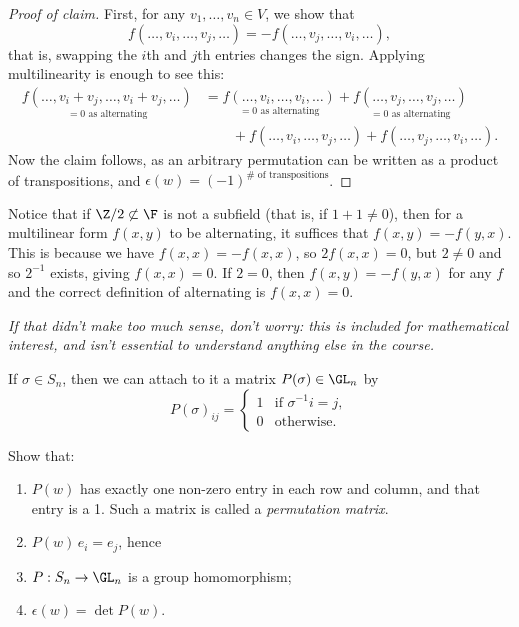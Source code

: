 \begin{proof}
	[Proof of claim] First, for any $v_1,\ldots,v_n\in V$, we show that %
	\begin{equation*}
		f(\ldots, v_i, \ldots, v_j, \ldots)
		= -f(\ldots,v_j,\ldots,v_i,\ldots),
	\end{equation*}
	that is, swapping the $i$th and $j$th entries changes the sign. Applying multilinearity is enough to see this: %
	\begin{align*}
		   \underset{=0 \text{ as alternating}}{f(\ldots,v_i+v_j,\ldots,v_i+v_j,\ldots)} %
		&= \underset{=0 \text{ as alternating}}{f(\ldots,v_i,\ldots,v_i,\ldots)}
		 + \underset{=0 \text{ as alternating}}{f(\ldots,v_j,\ldots,v_j,\ldots)} \\
		&\qquad
		 + f(\ldots,v_i,\ldots,v_j,\ldots)
		 + f(\ldots,v_j,\ldots,v_i,\ldots).
	\end{align*}
	Now the claim follows, as an arbitrary permutation can be written as a product of transpositions, and $\epsilon(w)=\left( -1 \right)^{\#\text{ of transpositions}}$. %
\end{proof}

\begin{remark}
	Notice that if $\Z/2\not\subset\F$ is not a subfield (that is, if $1+1\neq 0$), then for a multilinear form $f(x,y)$ to be alternating, it suffices that $f(x,y)=-f(y,x)$. This is because we have $f(x,x)=-f(x,x)$, so $2f(x,x)=0$, but $2\neq 0$ and so $2^{-1}$ exists, giving $f(x,x)=0$. If $2=0$, then $f(x,y)=-f(y,x)$ for any $f$ and the correct definition of alternating is $f(x,x)=0$. %

	\emph{If that didn't make too much sense, don't worry: this is included for mathematical interest, and isn't essential to understand anything else in the course.} %
\end{remark}

\begin{remark}
	If $\sigma\in S_n$, then we can attach to it a matrix $P(\sigma)\in\GL_n$ by %
	\begin{equation*}
		P(\sigma)_{ij} =
		\begin{cases}
			1 & \text{if } \sigma^{-1} i = j, \\ %
			0 & \text{otherwise}.
		\end{cases}
	\end{equation*}
\end{remark}

\begin{exercises}
Show that:
\begin{enumerate}
	\shortskip
	\item $P(w)$ has exactly one non-zero entry in each row and column, and that entry is a 1. Such a matrix is called a \emph{permutation matrix}. %
	\item $P(w)\,e_i = e_j$, hence
	\item $P:S_n \to \GL_n$ is a group homomorphism;
	\item $\epsilon(w)=\det P(w)$.
\end{enumerate}
\end{exercises}

